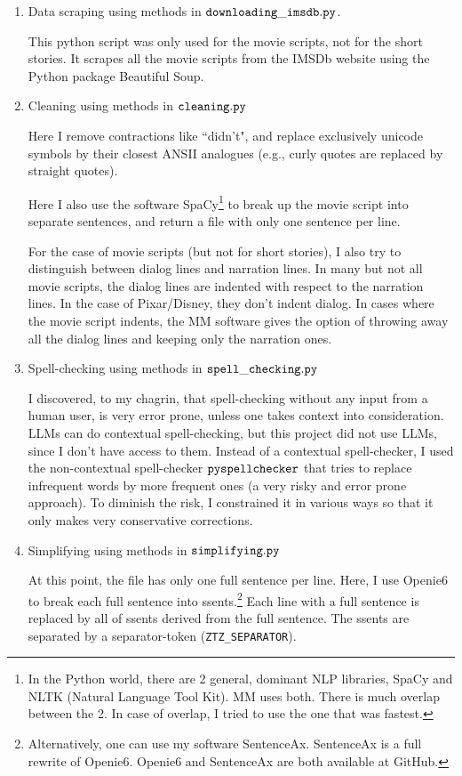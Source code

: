 \documentclass[12pt]{article}
\begin{document}
\begin{enumerate}
\item Data scraping using methods in $\tt downloading\_imsdb.py$.

This python script was only used for the movie
scripts, not for the short stories. It 
scrapes all the movie scripts from the IMSDb
website using the Python package Beautiful Soup.

\item Cleaning using methods in $\tt cleaning.py$

Here I remove contractions like ``didn't",
and replace exclusively unicode symbols 
by their closest ANSII analogues (e.g.,
curly quotes are replaced by straight quotes).

Here I also use the software SpaCy\footnote{In the Python
world, there are 2 general, dominant
NLP libraries, SpaCy and NLTK (Natural Language Tool Kit). MM uses both. There is much overlap
between the 2. In case of overlap, I tried to use the one that was fastest.} to break up the movie script into 
separate sentences, and return a file with only
one sentence per line.

For the case of movie scripts (but not for short 
stories), I also try to distinguish between 
dialog lines and narration lines.
In many but not all movie scripts, the dialog lines are indented with 
respect to the narration lines.
In the case of Pixar/Disney, they don't indent dialog. In cases where the movie script indents,
the MM software gives the option of throwing away all the dialog lines and keeping only the narration
ones.



\item Spell-checking using methods in $\tt spell\_checking.py$

I discovered, to my chagrin, that spell-checking
without any input from a human user,
is very error prone, unless one takes context into consideration. LLMs can do contextual spell-checking, but this project did not use LLMs,
since I don't have access to them.
Instead of a contextual spell-checker,
I used the non-contextual
spell-checker $\tt pyspellchecker$
that tries to replace infrequent words by
more frequent ones (a very risky
and error prone approach). To 
diminish the risk, I
 constrained it in various ways so
that it only makes very conservative corrections.

\item Simplifying using methods in $\tt simplifying.py$

At this point, the file
has only one
full sentence per line.
Here, I  use Openie6 to
break each full sentence into ssents.\footnote{Alternatively,
one can use my software SentenceAx.
SentenceAx is a full rewrite of Openie6. 
Openie6 and SentenceAx are both available at GitHub.
}
Each line with a full sentence is replaced by
all of ssents derived from the full sentence.  The
ssents are separated by 
a separator-token ({\tt ZTZ\_SEPARATOR}).



\end{enumerate}
\end{document}
